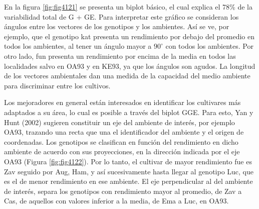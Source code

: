 En la figura \ref{fig:fig4121} se presenta un biplot básico, el cual explica el 78\% de la variabilidad total de G + GE. Para interpretar este gráfico se consideran los ángulos entre los vectores de los genotipos y los ambientes. Así se ve, por ejemplo, que el genotipo kat presenta un rendimiento por debajo del promedio en todos los ambientes, al tener un ángulo mayor a $90^{\circ}$ con todos los ambientes. Por otro lado, fun presenta un rendimiento por encima de la media en todos las localidades salvo en OA93 y en KE93, ya que los ángulos son agudos. La longitud de los vectores ambientales dan una medida de la capacidad del medio ambiente para discriminar entre los cultivos. 





Los mejoradores en general están interesados en identificar los cultivares más adaptados a su área, lo cual es posible a través del biplot GGE. Para esto, Yan y Hunt (2002) sugieren constituir un eje del ambiente de interés, por ejemplo OA93, trazando una recta que una el identificador del ambiente y el origen de coordenadas. Los genotipos se  clasifican en función del rendimiento en dicho ambiente de acuerdo con sus proyecciones, en la dirección indicada por el eje OA93 (Figura \ref{fig:fig4122}). Por lo tanto, el cultivar de mayor rendimiento fue es Zav seguido por Aug, Ham, y así sucesivamente hasta llegar al genotipo Luc, que es el de menor rendimiento en ese ambiente. El eje perpendicular al del ambiente de interés, separa los genotipos con rendimiento mayor al promedio, de Zav a Cas, de aquellos con valores inferior a la media, de Ema a Luc, en OA93.

